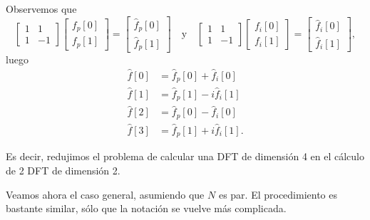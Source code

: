 \documentclass[12pt, a4paper]{amsbook}
\theoremstyle{remark}
\theoremstyle{definition}
\numberwithin{section}{chapter}
\numberwithin{subsection}{section}
\numberwithin{equation}{section}
\numberwithin{figure}{chapter}
\begin{document}
Observemos que
$$
\begin{bmatrix}
1 & 1\\
1 & -1 
\end{bmatrix}
\begin{bmatrix}
f_p[0]\\
f_p[1]
\end{bmatrix}
=
\begin{bmatrix}
\hat f_p[0]\\
\hat f_p[1]
\end{bmatrix}\quad \text{y}\quad
\begin{bmatrix}
1 & 1\\
1 & -1 
\end{bmatrix}
\begin{bmatrix}
f_i[0]\\
f_i[1]
\end{bmatrix}
=
\begin{bmatrix}
\hat f_i[0]\\
\hat f_i[1]
\end{bmatrix},
$$
luego
\begin{align*}
\hat f[0] &= \hat f_p[0] + \hat f_i[0]\\
\hat f[1] &= \hat f_p[1] -i \hat f_i[1]\\
\hat f[2] &= \hat f_p[0] - \hat f_i[0]\\
\hat f[3] &= \hat f_p[1] + i \hat f_i[1].
\end{align*}

Es decir, redujimos el problema de calcular una DFT de dimensión 4 en el cálculo de 2 DFT de dimensión 2.

Veamos ahora el caso general, asumiendo que $N$ es par. El procedimiento es bastante similar, sólo que la notación se vuelve más complicada.
\end{document}
